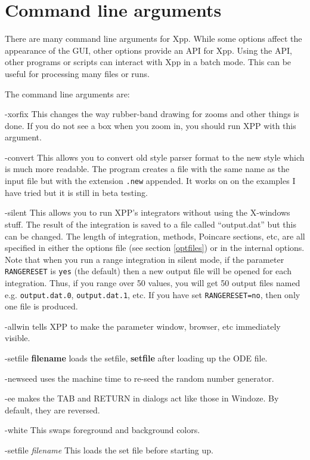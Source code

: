 \section{Command line arguments}
There are many command line arguments for Xpp.  While some options affect the appearance of the GUI, other options provide an API for Xpp.  Using the API, other programs or scripts can interact with Xpp in a batch mode.  This can be useful for processing many files or runs. 

The command line arguments are: 
\begin{description}
\item{-xorfix} This changes the way rubber-band drawing for zooms and
other things is done. If you do not see a box when you zoom in, you
should run XPP with this argument.
\item{-convert}  This allows you to convert old style parser format to
the new style which is much more readable. The program creates a file
with the same name as the input file but with the extension {\tt .new}
appended. It works on on the examples I have tried but it is still in
beta testing.
\item{-silent} This allows you to run XPP's integrators without using
the X-windows stuff.  The result of the integration is saved to a file
called ``output.dat'' but this can be changed. The length of
integration, methods, Poincare sections, etc, are all specified in
either the options file (see section \ref{optfiles})
 or in the internal options. Note that when you run a range integration
in silent mode, if the parameter {\tt RANGERESET} is {\tt yes} (the default) 
then a new output file will be opened for each integration. Thus, if you range 
over 50 values, you will get 50 output files named e.g. {\tt output.dat.0}, 
{\tt output.dat.1}, etc. If you have set {\tt RANGERESET=no}, then only
one file is produced.
\item{-allwin} tells XPP to make the parameter window, browser, etc
immediately visible.
\item{-setfile {\bf filename}} loads the setfile, {\bf setfile} after
loading up the  ODE file.
\item{-newseed} uses the machine time to re-seed the random number
generator. 
\item{-ee} makes the TAB and RETURN in dialogs act like those in
Windoze. By default, they are reversed.  
\item{-white} This swaps foreground and background colors. 
\item{-setfile \emph{filename}}  This loads the set file before starting up.

\end{description}
